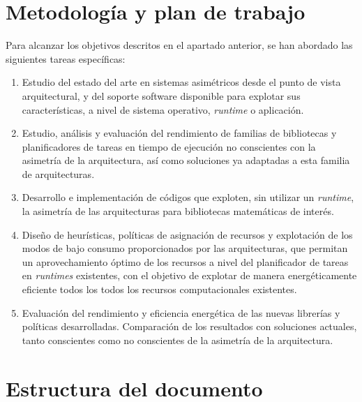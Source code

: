 \section{Metodología y plan de trabajo}
Para alcanzar los objetivos descritos en el apartado anterior, se han
abordado las siguientes tareas específicas:
\begin{enumerate}[T1.]
\item Estudio del estado del arte en sistemas asimétricos desde el punto de
  vista arquitectural, y del soporte software disponible para explotar sus
  características, a nivel de sistema operativo, \emph{runtime} o
  aplicación.
\item Estudio, análisis y evaluación del rendimiento de familias de
  bibliotecas y planificadores de tareas en tiempo de ejecución no
  conscientes con la asimetría de la arquitectura, así como soluciones ya
  adaptadas a esta familia de arquitecturas.
\item Desarrollo e implementación de códigos que exploten, sin utilizar un
  \emph{runtime}, la asimetría de las arquitecturas para bibliotecas
  matemáticas de interés.
\item Diseño de heurísticas, políticas de asignación de recursos y
  explotación de los modos de bajo consumo proporcionados por las
  arquitecturas, que permitan un aprovechamiento óptimo de los recursos a
  nivel del planificador de tareas en \emph{runtimes} existentes, con el
  objetivo de explotar de manera energéticamente eficiente todos los todos
  los recursos computacionales existentes.
\item Evaluación del rendimiento y eficiencia energética de las nuevas
  librerías y políticas desarrolladas. Comparación de los resultados con
  soluciones actuales, tanto conscientes como no conscientes de la
  asimetría de la arquitectura.
\end{enumerate}

\section{Estructura del documento}

